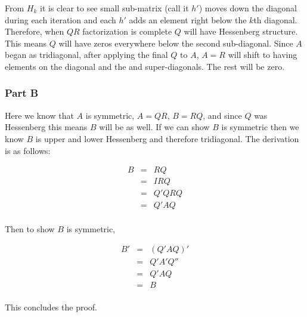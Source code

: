 From \(H_k\) it is clear to see small sub-matrix (call it \(h'\)) moves down the diagonal during each iteration and each \(h'\) adds an element right below the \(k\)th diagonal.
Therefore, when \(QR\) factorization is complete \(Q\) will have Hessenberg structure.
This means \(Q\) will have zeros everywhere below the second sub-diagonal.
Since \(A\) began as tridiagonal, after applying the final \(Q\) to \(A\), \(A=R\) will shift to having elements on the diagonal and the  and  super-diagonals.
The rest will be zero.

\newpage
\subsubsection{Part B}

Here we know that \(A\) is symmetric, \(A=QR\), \(B=RQ\), and since \(Q\) was Hessenberg this means \(B\) will be as well.
If we can show \(B\) is symmetric then we know \(B\) is upper and lower Hessenberg and therefore tridiagonal.
The derivation is as follows:

\begin{eqnarray}
  B &=& RQ \\
  &=& IRQ \\
  &=& Q'QRQ \\
  &=& Q'AQ \\
\end{eqnarray}

Then to show \(B\) is symmetric,

\begin{eqnarray}
  B' &=& (Q'AQ)' \\
  &=& Q'A'Q'' \\
  &=& Q'AQ \\
  &=& B \\
\end{eqnarray}

This concludes the proof.

%

